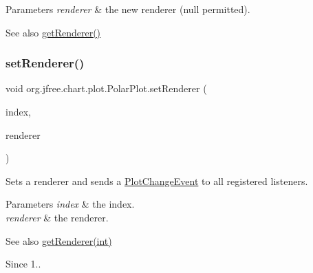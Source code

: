 \begin{DoxyParams}{Parameters}
{\em renderer} & the new renderer ({\ttfamily null} permitted).\\
\hline
\end{DoxyParams}
\begin{DoxySeeAlso}{See also}
\mbox{\hyperlink{classorg_1_1jfree_1_1chart_1_1plot_1_1_polar_plot_a49334753a560393d54d2d988577bd23c}{get\+Renderer()}} 
\end{DoxySeeAlso}
\mbox{\label{classorg_1_1jfree_1_1chart_1_1plot_1_1_polar_plot_a3385d278068d3cf8773bda485a7ddb68}} 
\subsubsection{\texorpdfstring{set\+Renderer()}{setRenderer()}\hspace{0.1cm}{\footnotesize\ttfamily [2/3]}}
{\footnotesize\ttfamily void org.\+jfree.\+chart.\+plot.\+Polar\+Plot.\+set\+Renderer (\begin{DoxyParamCaption}\item[{int}]{index,  }\item[{\mbox{\hyperlink{interfaceorg_1_1jfree_1_1chart_1_1renderer_1_1_polar_item_renderer}{Polar\+Item\+Renderer}}}]{renderer }\end{DoxyParamCaption})}

Sets a renderer and sends a \mbox{\hyperlink{}{Plot\+Change\+Event}} to all registered listeners.


\begin{DoxyParams}{Parameters}
{\em index} & the index. \\
\hline
{\em renderer} & the renderer.\\
\hline
\end{DoxyParams}
\begin{DoxySeeAlso}{See also}
\mbox{\hyperlink{classorg_1_1jfree_1_1chart_1_1plot_1_1_polar_plot_afad236333ed9dff60408dc1827779646}{get\+Renderer(int)}}
\end{DoxySeeAlso}
\begin{DoxySince}{Since}
1.. 
\end{DoxySince}
\mbox{\label{classorg_1_1jfree_1_1chart_1_1plot_1_1_polar_plot_a6e02f16d0266c4d0a68538564712c76a}} 
